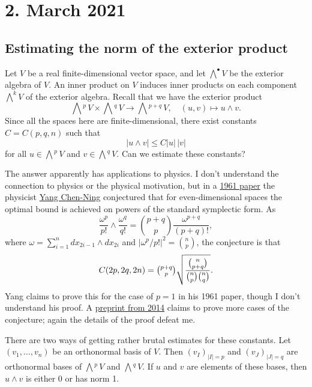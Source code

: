\documentclass[11pt]{amsart}
\theoremstyle{definition}
\newcommand{\ext}[1]{\bigwedge{}^{\!\!#1}\,}
\begin{document}
\section*{2. March 2021}

\subsection*{Estimating the norm of the exterior product}

Let \(V\) be a real finite-dimen\-sional vector space, and let \(\bigwedge^\bullet V\) be the exterior algebra of \(V\).
An inner product on \(V\) induces inner products on each component \(\bigwedge^k V\) of the exterior algebra.
Recall that we have the exterior product
\[
\ext{p} V \times \ext{q} V \to \ext{p+q} V,
\quad
(u, v) \mapsto u \wedge v.
\]
Since all the spaces here are finite-dimensional, there exist constants \(C = C(p,q,n)\) such that
\[
|u \wedge v| \leq C |u| \, |v|
\]
for all \(u \in \ext p V\) and \(v \in \ext q V\). Can we estimate these constants?

The answer apparently has applications to physics.
I don't understand the connection to physics or the physical motivation, but in a \href{https://aip.scitation.org/doi/10.1063/1.1703969}{1961 paper} the physicist \href{https://en.wikipedia.org/wiki/Yang_Chen-Ning}{Yang Chen-Ning} conjectured that for even-dimensional spaces the optimal bound is achieved on powers of the standard symplectic form.
As
\[
\frac{\omega^p}{p!} \wedge \frac{\omega^q}{q!} = \binom{p+q}p \frac{\omega^{p+q}}{(p+q)!},
\]
where \(\omega = \sum_{i=1}^n dx_{2i-1} \wedge dx_{2i}\) and \(|\omega^p / p!|^2 = \binom np\), the conjecture is that
\[
C(2p,2q,2n) = \tbinom{p+q}p\sqrt{\frac{\binom{n}{p+q}}{\binom np \binom nq}}.
\]
Yang claims to prove this for the case of \(p = 1\) in his 1961 paper, though I don't understand his proof.
A \href{https://arxiv.org/abs/1409.3931}{preprint from 2014} claims to prove more cases of the conjecture; again the details of the proof defeat me.

There are two ways of getting rather brutal estimates for these constants.
Let \((v_1, \ldots, v_n)\) be an orthonormal basis of \(V\).
Then \((v_I)_{|I| = p}\) and \((v_J)_{|J|=q}\) are orthonormal bases of \(\ext p V\) and \(\ext q V\).
If \(u\) and \(v\) are elements of these bases, then \(u \wedge v\) is either 0 or has norm 1.
\end{document}
